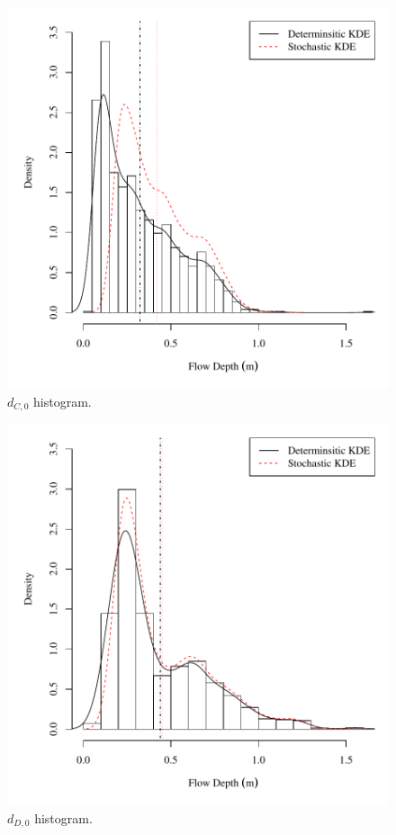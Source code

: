 \begin{center}
\begin{figure}[htbp]
	\includegraphics[width=6in]{"Figures/Results_USR/V density depthC1"}
	\caption{$d_{C,0}$ histogram.}
\end{figure}
\end{center}
\newpage

\begin{center}
\begin{figure}[htbp]
	\includegraphics[width=6in]{"Figures/Results_USR/V density depthD1"}
	\caption{$d_{D,0}$ histogram.}
\end{figure}
\end{center}
\newpage

